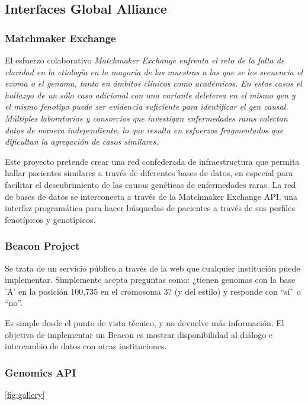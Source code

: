 \documentclass[
10pt, %
letterpaper, %
oneside, %
headinclude,footinclude, %
BCOR5mm, %
]{scrartcl}
\begin{document}
\subsection{Interfaces Global Alliance}



\subsubsection{Matchmaker Exchange}

El esfuerzo colaborativo \em{Matchmaker Exchange} enfrenta el reto de la
falta de claridad en la etiología en la mayoría de las muestras a las
que se les secuencia el exoma o el genoma, tanto en ámbitos clínicos
como académicos. En estos casos el hallazgo de un sólo caso adicional
con una variante deleterea en el mismo gen y el mismo fenotipo puede
ser evidencia suficiente para identificar el gen causal. Múltiples
laboratorios y consorcios que investigan enfermedades raras colectan
datos de manera independiente, lo que resulta en esfuerzos
fragmentados que dificultan la agregación de casos similares.

Este proyecto pretende crear una red confederada de infraestructura
que permita hallar pacientes similares a través de diferentes bases de
datos, en especial para facilitar el descubrimiento de las causas
genéticas de enfermedades raras. La red de bases de datos se
interconecta a través de la Matchmaker Exchange API, una interfaz
programática para hacer búsquedas de pacientes a través de sus
perfiles fenotípicos y genotípicos.


\subsubsection{Beacon Project}
Se trata de un servicio público a través de la web que cualquier
institución puede implementar. Simplemente acepta preguntas como:
¿tienen genomas con la base 'A' en la posición 100,735 en el cromosoma
3? (y del estilo) y responde con ``sí'' o ``no''.

Es simple desde el punto de vista técnico, y no devuelve más
información. El objetivo de implementar un Beacon es mostrar
disponibilidad al diálogo e intercambio de datos con otras
instituciones.


\subsubsection{Genomics API}

\vref{fig:gallery}
\end{document}
